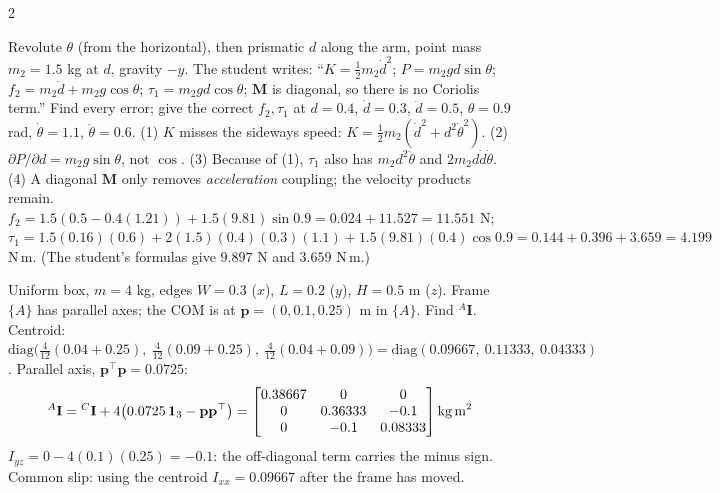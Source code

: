\begin{multicols}{2}
\begin{examq}
Revolute $\theta$ (from the horizontal), then prismatic $d$ along the arm, point mass $m_2=1.5$ kg at $d$, gravity $-y$. The student writes: ``$K=\tfrac12m_2\dot d^2$; $P=m_2gd\sin\theta$; $f_2=m_2\ddot d+m_2g\cos\theta$; $\tau_1=m_2gd\cos\theta$; $\mathbf M$ is diagonal, so there is no Coriolis term.'' Find every error; give the correct $f_2,\tau_1$ at $d=0.4$, $\dot d=0.3$, $\ddot d=0.5$, $\theta=0.9$ rad, $\dot\theta=1.1$, $\ddot\theta=0.6$.
\solution
(1) $K$ misses the sideways speed: $K=\tfrac12m_2(\dot d^2+d^2\dot\theta^2)$. (2) $\partial P/\partial d=m_2g\sin\theta$, not $\cos$. (3) Because of (1), $\tau_1$ also has $m_2d^2\ddot\theta$ and $2m_2d\dot d\dot\theta$. (4) A diagonal $\mathbf M$ only removes \emph{acceleration} coupling; the velocity products remain.\\
$f_2=1.5(0.5-0.4(1.21))+1.5(9.81)\sin0.9=0.024+11.527=\boxed{11.551}$ N; $\tau_1=1.5(0.16)(0.6)+2(1.5)(0.4)(0.3)(1.1)+1.5(9.81)(0.4)\cos0.9=0.144+0.396+3.659=\boxed{4.199}$ N\,m. (The student's formulas give $9.897$ N and $3.659$ N\,m.) \chk
\end{examq}

\begin{examq}
Uniform box, $m=4$ kg, edges $W=0.3$ ($x$), $L=0.2$ ($y$), $H=0.5$ m ($z$). Frame $\{A\}$ has parallel axes; the COM is at $\mathbf p=(0,0.1,0.25)$ m in $\{A\}$. Find ${}^A\mathbf I$.
\solution
Centroid: $\mathrm{diag}\big(\tfrac4{12}(0.04+0.25),\ \tfrac4{12}(0.09+0.25),\ \tfrac4{12}(0.04+0.09)\big)=\mathrm{diag}(0.09667,\ 0.11333,\ 0.04333)$. Parallel axis, $\mathbf p^\top\mathbf p=0.0725$:
\[{}^A\mathbf I={}^C\mathbf I+4\big(0.0725\,\mathbf 1_3-\mathbf p\mathbf p^\top\big)=\begin{bmatrix}0.38667&0&0\\0&0.36333&-0.1\\0&-0.1&0.08333\end{bmatrix}\text{kg\,m}^2\]
$I_{yz}=0-4(0.1)(0.25)=-0.1$: the off-diagonal term carries the minus sign. Common slip: using the centroid $I_{xx}=0.09667$ after the frame has moved. \chk
\end{examq}


\end{multicols}
